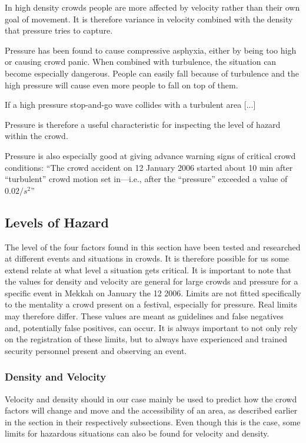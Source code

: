 In high density crowds people are more affected by velocity rather than their own goal of movement. It is therefore variance in velocity combined with the density that pressure tries to capture.

Pressure has been found to cause compressive asphyxia, either by being too high or causing crowd panic. When combined with turbulence, the situation can become especially dangerous. People can easily fall because of turbulence and the high pressure will cause even more people to fall on top of them.

If a high pressure stop-and-go wave collides with a turbulent area [...]

Pressure is therefore a useful characteristic for inspecting the level of hazard within the crowd.

Pressure is also especially good at giving advance warning signs of critical crowd conditions: \enquote{The crowd accident on 12 January 2006 started about 10 min after “turbulent” crowd motion set in—i.e., after the “pressure” exceeded a value of $0.02/s^2$}

\subsection{Levels of Hazard}
\label{subsec:levelsOfHazard}
The level of the four factors found in this section have been tested and researched at different events and situations in crowds. It is therefore possible for us some extend relate at what level a situation gets critical. It is important to note that the values for density and velocity are general for large crowds and pressure for a specific event in Mekkah on January the 12 2006. Limits are not fitted specifically to the mentality a crowd present on a festival, especially for pressure. Real limits may therefore differ. These values are meant as guidelines and false negatives and, potentially false positives, can occur. It is always important to not only rely on the registration of these limits, but to always have experienced and trained security personnel present and observing an event.

\subsubsection{Density and Velocity}
Velocity and density should in our case mainly be used to predict how the crowd factors will change and move and the accessibility of an area, as described earlier in the section in their respectively subsections. Even though this is the case, some limits for hazardous situations can also be found for velocity and density.

